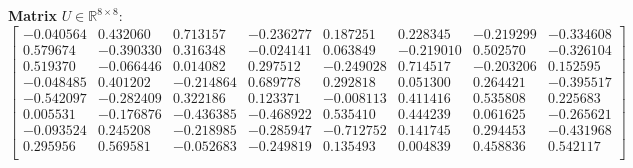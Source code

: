 \textbf{Matrix } $U \in \mathbb{R}^{8 \times 8}$: 
\begin{equation*}
\begin{bmatrix}
-0.040564 & 0.432060 & 0.713157 & -0.236277 & 0.187251 & 0.228345 & -0.219299 & -0.334608 \\
0.579674 & -0.390330 & 0.316348 & -0.024141 & 0.063849 & -0.219010 & 0.502570 & -0.326104 \\
0.519370 & -0.066446 & 0.014082 & 0.297512 & -0.249028 & 0.714517 & -0.203206 & 0.152595 \\
-0.048485 & 0.401202 & -0.214864 & 0.689778 & 0.292818 & 0.051300 & 0.264421 & -0.395517 \\
-0.542097 & -0.282409 & 0.322186 & 0.123371 & -0.008113 & 0.411416 & 0.535808 & 0.225683 \\
0.005531 & -0.176876 & -0.436385 & -0.468922 & 0.535410 & 0.444239 & 0.061625 & -0.265621 \\
-0.093524 & 0.245208 & -0.218985 & -0.285947 & -0.712752 & 0.141745 & 0.294453 & -0.431968 \\
0.295956 & 0.569581 & -0.052683 & -0.249819 & 0.135493 & 0.004839 & 0.458836 & 0.542117 \\
\end{bmatrix}
\end{equation*}

